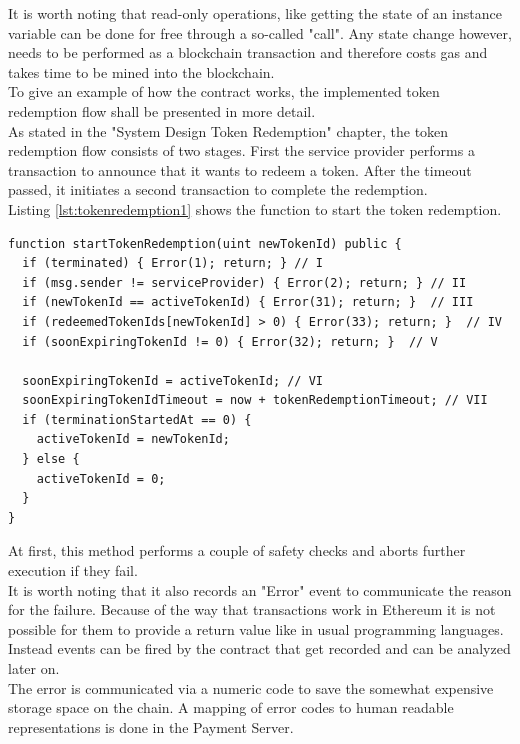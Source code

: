\documentclass[a4paper,12pt]{scrartcl}
\begin{document}
It is worth noting that read-only operations, like getting the state of an instance variable can be done for free through a so-called "call". Any state change however, needs to be performed as a blockchain transaction and therefore costs gas and takes time to be mined into the blockchain.\\

To give an example of how the contract works, the implemented token redemption flow shall be presented in more detail.\\

As stated in the "System Design Token Redemption" chapter, the token redemption flow consists of two stages. First the service provider performs a transaction to announce that it wants to redeem a token. After the timeout passed, it initiates a second transaction to complete the redemption.\\

Listing \ref{lst:tokenredemption1} shows the function to start the token redemption.\\

\begin{lstlisting}[caption={Start token redemption.},label=lst:tokenredemption1]
function startTokenRedemption(uint newTokenId) public {
  if (terminated) { Error(1); return; } // I
  if (msg.sender != serviceProvider) { Error(2); return; } // II
  if (newTokenId == activeTokenId) { Error(31); return; }  // III
  if (redeemedTokenIds[newTokenId] > 0) { Error(33); return; }  // IV
  if (soonExpiringTokenId != 0) { Error(32); return; }  // V

  soonExpiringTokenId = activeTokenId; // VI
  soonExpiringTokenIdTimeout = now + tokenRedemptionTimeout; // VII
  if (terminationStartedAt == 0) {
    activeTokenId = newTokenId;
  } else {
    activeTokenId = 0;
  }
}
\end{lstlisting}

At first, this method performs a couple of safety checks and aborts further execution if they fail.\\
It is worth noting that it also records an "Error" event to communicate the reason for the failure. Because of the way that transactions work in Ethereum it is not possible for them to provide a return value like in usual programming languages. Instead events can be fired by the contract that get recorded and can be analyzed later on.\\
The error is communicated via a numeric code to save the somewhat expensive storage space on the chain. A mapping of error codes to human readable representations is done in the Payment Server.\\
\end{document}
